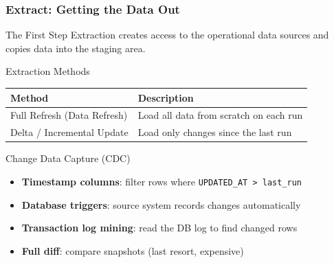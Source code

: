 
\begin{frame}
  \frametitle{Extract: Getting the Data Out}

  \begin{block}{The First Step}
    Extraction creates access to the operational data sources and copies
    data into the staging area.
  \end{block}

  \begin{block}{Extraction Methods}
    \begin{tabularx}{\linewidth}{@{}l X@{}}
      \toprule
      \textbf{Method}             & \textbf{Description} \\
      \midrule
      Full Refresh (Data Refresh) & Load all data from scratch on each run \\
      Delta / Incremental Update  & Load only changes since the last run \\
      \bottomrule
    \end{tabularx}
  \end{block}

  \begin{block}{Change Data Capture (CDC)}
    \begin{itemize}
      \item \textbf{Timestamp columns}: filter rows where \texttt{UPDATED\_AT > last\_run}
      \item \textbf{Database triggers}: source system records changes automatically
      \item \textbf{Transaction log mining}: read the DB log to find changed rows
      \item \textbf{Full diff}: compare snapshots (last resort, expensive)
    \end{itemize}
  \end{block}
\end{frame}

